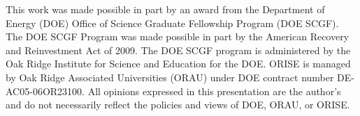 







This work was made possible in part by an award from the Department of Energy (DOE) Office of Science Graduate Fellowship Program (DOE SCGF). 
The DOE SCGF Program was made possible in part by the American Recovery and Reinvestment Act of 2009. 
The DOE SCGF program is administered by the Oak Ridge Institute for Science and Education for the DOE. 
ORISE is managed by Oak Ridge Associated Universities (ORAU) under DOE contract number DE- AC05-06OR23100. 
All opinions expressed in this presentation are the author's and do not necessarily reflect the policies and views of DOE, ORAU, or ORISE.
